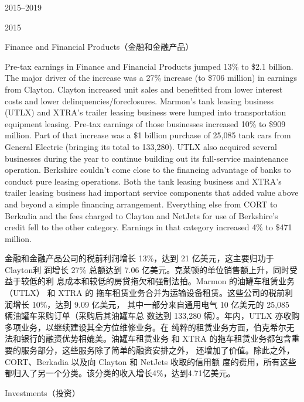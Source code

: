 \begin{chapter}{2015--2019}
\begin{section}{2015}
\begin{subsection}{Finance and Financial Products（金融和金融产品）}
\begin{verseparallel}
  {
    Pre-tax earnings in Finance and Financial Products jumped 13\% to \$2.1
    billion. The major driver of the increase was a 27\% increase (to \$706
    million) in earnings from Clayton. Clayton increased unit sales and
    benefitted from lower interest costs and lower delinquencies/foreclosures.
    Marmon’s tank leasing business (UTLX) and XTRA’s trailer leasing business
    were lumped into transportation equipment leasing. Pre-tax earnings of those
    businesses increased 10\% to \$909 million. Part of that increase was a \$1
    billion purchase of 25,085 tank cars from General Electric (bringing its
    total to 133,280). UTLX also acquired several businesses during the year to
    continue building out its full-service maintenance operation. Berkshire
    couldn’t come close to the financing advantage of banks to conduct pure
    leasing operations. Both the tank leasing business and XTRA’s trailer
    leasing business had important service components that added value above and
    beyond a simple financing arrangement. Everything else from CORT to Berkadia
    and the fees charged to Clayton and NetJets for use of Berkshire’s credit
    fell to the other category. Earnings in that category increased 4\% to \$471
    million. \\
  }
  {

    金融和金融产品公司的税前利润增长 13\%，达到 21 亿美元，这主要归功于 Clayton利
    润增长 27\% 总额达到 7.06 亿美元。克莱顿的单位销售额上升，同时受益于较低的利
    息成本和较低的房贷拖欠和强制法拍。Marmon 的油罐车租赁业务（UTLX） 和 XTRA 的
    拖车租赁业务合并为运输设备租赁。这些公司的税前利润增长 10\%，达到 9.09 亿美元，
    其中一部分来自通用电气 10 亿美元的 25,085 辆油罐车采购订单（采购后其油罐车总
    数达到 133,280 辆）。年内，UTLX 亦收购多项业务，以继续建设其全方位维修业务。在
    纯粹的租赁业务方面，伯克希尔无法和银行的融资优势相媲美。油罐车租赁业务
    和 XTRA 的拖车租赁业务都包含重要的服务部分，这些服务除了简单的融资安排之外，
    还增加了价值。除此之外，CORT、Berkadia 以及向 Clayton 和 NetJets 收取的信用额
    度的费用，所有这些都归入了另一个分类。该分类的收入增长4\%，达到4.71亿美元。

  }
\end{verseparallel}
\end{subsection}

\begin{subsection}{Investments（投资）}
\begin{verseparallel}
  {

}
\end{verseparallel}
\end{subsection}
\end{section}
\end{chapter}
